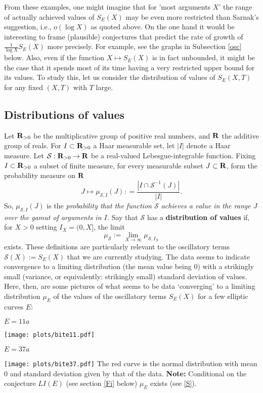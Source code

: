 \documentclass[11pt]{article}
\theoremstyle{plain}
\theoremstyle{definition}
\numberwithin{equation}{section}
\numberwithin{figure}{section}
\numberwithin{table}{section}
\def\SS{\mathcal{S}}
\def\R{{\bf R}}
\begin{document}
 From these examples, one might imagine that for 'most arguments $X$' the range of actually achieved values of $S_E(X)$  may be even more restricted than Sarnak's suggestion, i.e., $o(\log X)$ as quoted above.  On the one hand it would be interesting to frame (plausible)  conjectures that predict  the rate of growth of  ${\frac{1}{\log X}}S_E(X)$  more precisely. For example, see the graphs in Subsection \ref{osc} below.  Also, even if  the function $X \mapsto S_E(X)$ is in fact unbounded, it might be the case that it spends most of its time having a very restricted upper bound for its values.  To study this, let us consider the distribution of values of $S_E(X,T)$ for any fixed $(X,T)$ with $T$ large.



\subsection{Distributions of values }

Let ${\R}_{>0}$ be the multiplicative group of positive real numbers, and ${\R}$ the additive group of reals. For $I \subset {\R}_{>0}$ a Haar measurable set, let $|I|$ denote a Haar measure.  Let ${\SS}:{\R}_{>0} \to {\R}$ be a real-valued Lebesgue-integrable function.  Fixing $I \subset {\R}_{>0}$ a subset  of finite measure,  for every measurable subset $J\subset {\R}$, form the probability measure on ${\R}$
$$J\mapsto \mu_{{\SS},I}(J): = {\frac{|I\cap {\SS}^{-1}(J)|}{|I|}}.$$  So, $\mu_{{\SS},I}(J)$ is the {\it probability that the function ${\SS}$ achieves a value in the range $J$ over the gamut of arguments in $I$.}   Say that ${\SS}$ has a {\bf distribution of values} if, for $X > 0$ setting $I_X= (0,X]$, the limit  $$\mu_{{\SS}}:= \lim_{X \to \infty}\mu_{{\SS},I_X}$$ exists. These  definitions are particularly relevant to the oscillatory terms ${\SS}(X):= S_E(X)$ that we are currently studying. The data seems to indicate convergence to a limiting distribution (the  mean  value being $0$) with a strikingly small (variance, or equivalently: strikingly small) standard deviation of values.
\vskip20pt
Here, then, are some pictures  of what seems to be data `converging' to a limiting  distribution $\mu_E$ of the values of the oscillatory terms $S_E(X)$ for a few elliptic curves $E$:
  \vskip10pt
  \centerline{ $E = 11a$}
 \vskip10pt
 \hskip100pt\texttt{[image: plots/bite11.pdf]}
    \vskip10pt
  \centerline{ $E = 37a$}
  \vskip10pt
 \hskip100pt\texttt{[image: plots/bite37.pdf]}
    \vskip10pt
       The red curve is the normal distribution with mean $0$ and standard deviation given by that of the data.
   \vskip10pt
    {\bf  Note: } Conditional on the conjecture $LI(E)$ (see section \ref{Fi} below) $\mu_E$ exists (see \ref{S}).
\end{document}
